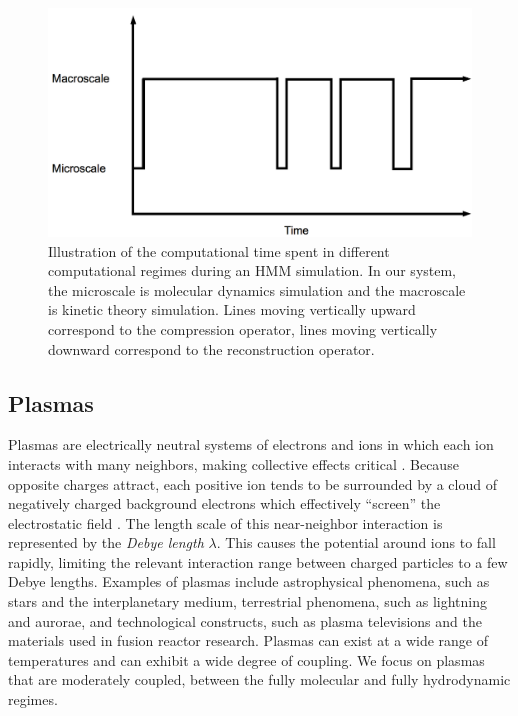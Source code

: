 \documentclass{article}
\begin{document}
\begin{figure}[ht]
	\center \includegraphics[width=.8\linewidth]{scheme.png}
	\caption{Illustration of the computational time spent in different computational regimes during an HMM simulation. In our system, the microscale is molecular dynamics simulation and the macroscale is kinetic theory simulation. Lines moving vertically upward correspond to the compression operator, lines moving vertically downward correspond to the reconstruction operator.}
	\label{HMM}
\end{figure}

\subsection{Plasmas}

Plasmas are electrically neutral systems of electrons and ions in which each ion interacts with many neighbors, making collective effects critical \cite{sturrock1994plasma}. Because opposite charges attract, each positive ion tends to be surrounded by a cloud of negatively charged background electrons which effectively ``screen'' the electrostatic field \cite{chen2006plasma}. The length scale of this near-neighbor interaction is represented by the \emph{Debye length} $\lambda$. This causes the potential around ions to fall rapidly, limiting the relevant interaction range between charged particles to a few Debye lengths. Examples of plasmas include astrophysical phenomena, such as stars and the interplanetary medium, terrestrial phenomena, such as lightning and aurorae, and technological constructs, such as plasma televisions and the materials used in fusion reactor research. Plasmas can exist at a wide range of temperatures and can exhibit a wide degree of coupling. We focus on plasmas that are moderately coupled, between the fully molecular and fully hydrodynamic regimes.
\end{document}
